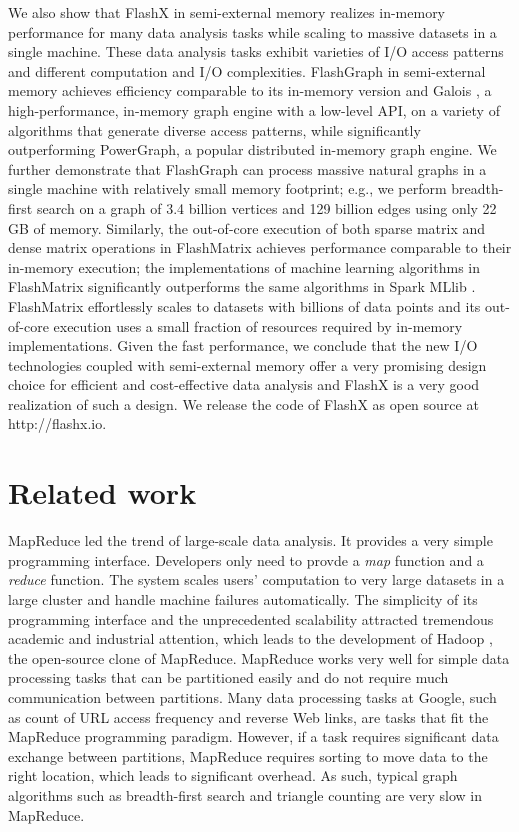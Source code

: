 We also show that FlashX in semi-external memory realizes
in-memory performance for many data analysis tasks while scaling to massive
datasets in a single machine. These data analysis tasks exhibit varieties of
I/O access patterns and different computation and I/O complexities.
FlashGraph in semi-external memory achieves
efficiency comparable to its in-memory version and Galois \cite{galois},
a high-performance, in-memory graph engine with a low-level API, on
a variety of algorithms that generate diverse access patterns, while
significantly outperforming PowerGraph, a popular distributed in-memory
graph engine. We further demonstrate that FlashGraph can process massive
natural graphs in a single machine with relatively small memory footprint;
e.g., we perform breadth-first search on a graph of 3.4 billion vertices
and 129 billion edges using only 22 GB of memory. Similarly, the out-of-core
execution of both sparse matrix and dense matrix operations in FlashMatrix
achieves performance comparable to their in-memory execution; the implementations
of machine learning algorithms in FlashMatrix
significantly outperforms the same algorithms in Spark MLlib \cite{mllib}.
FlashMatrix effortlessly scales to datasets with billions of data points and
its out-of-core execution uses a small fraction of resources required by
in-memory implementations. Given the fast performance, we conclude that
the new I/O technologies coupled with semi-external memory offer a very
promising design choice for efficient and cost-effective data analysis and
FlashX is a very good realization of such a design. We release the code of
FlashX as open source at http://flashx.io.

\section{Related work}
MapReduce \cite{mapreduce} led the trend of large-scale data analysis. It
provides a very simple programming interface. Developers only need to provde
a \textit{map} function and
a \textit{reduce} function. The system scales users' computation to very large
datasets in a large cluster and handle machine failures automatically.
The simplicity of its programming interface and the unprecedented scalability
attracted tremendous academic and industrial attention, which leads to
the development of Hadoop \cite{hadoop}, the open-source clone of MapReduce.
MapReduce works very well for simple data processing tasks that can be
partitioned easily and do not require much communication between partitions.
Many data processing tasks at Google, such as count of URL access frequency
and reverse Web links, are tasks that fit the MapReduce programming paradigm.
However, if a task requires significant data exchange between partitions,
MapReduce requires sorting to move data to the right location, which leads
to significant overhead. As such, typical graph algorithms such as breadth-first
search and triangle counting are very slow in MapReduce.

